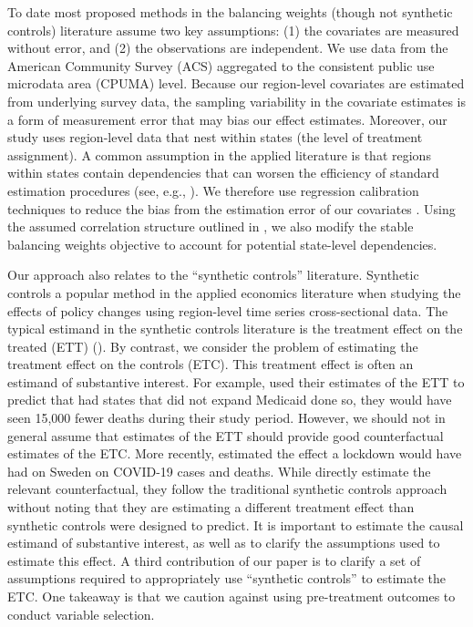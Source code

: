 To date most proposed methods in the balancing weights (though not synthetic controls) literature assume two key assumptions: (1) the covariates are measured without error, and (2) the observations are independent. We use data from the American Community Survey (ACS) aggregated to the consistent public use microdata area (CPUMA) level. Because our region-level covariates are estimated from underlying survey data, the sampling variability in the covariate estimates is a form of measurement error that may bias our effect estimates. Moreover, our study uses region-level data that nest within states (the level of treatment assignment). A common assumption in the applied literature is that regions within states contain dependencies that can worsen the efficiency of standard estimation procedures (see, e.g., \cite{cameron2015practitioner}). We therefore use regression calibration techniques to reduce the bias from the estimation error of our covariates \cite{gleser1992importance}. Using the assumed correlation structure outlined in \cite{kloek1981ols}, we also modify the stable balancing weights objective to account for potential state-level dependencies. 

Our approach also relates to the ``synthetic controls'' literature. Synthetic controls a popular method in the applied economics literature when studying the effects of policy changes using region-level time series cross-sectional data. The typical estimand in the synthetic controls literature is the treatment effect on the treated (ETT) (\cite{abadie2010synthetic}). By contrast, we consider the problem of estimating the treatment effect on the controls (ETC). This treatment effect is often an estimand of substantive interest. For example, \cite{miller2019medicaid} used their estimates of the ETT to predict that had states that did not expand Medicaid done so, they would have seen 15,000 fewer deaths during their study period. However, we should not in general assume that estimates of the ETT should provide good counterfactual estimates of the ETC. More recently, \cite{born2020lockdowns} estimated the effect a lockdown would have had on Sweden on COVID-19 cases and deaths. While \cite{born2020lockdowns} directly estimate the relevant counterfactual, they follow the traditional synthetic controls approach without noting that they are estimating a different treatment effect than synthetic controls were designed to predict. It is important to estimate the causal estimand of substantive interest, as well as to clarify the assumptions used to estimate this effect. A third contribution of our paper is to clarify a set of assumptions required to appropriately use ``synthetic controls'' to estimate the ETC. One takeaway is that we caution against using pre-treatment outcomes to conduct variable selection. 

